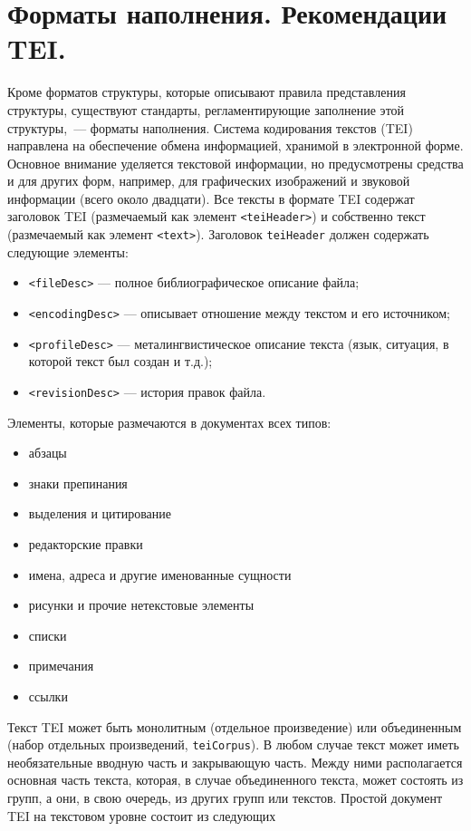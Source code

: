 \documentclass[12pt]{article}
\theoremstyle{definition}
\theoremstyle{remark}
\numberwithin{equation}{section}
\begin{document}
\section{Форматы наполнения. Рекомендации TEI.}
\label{sec:TEI}
Кроме форматов структуры, которые описывают правила представления структуры, существуют стандарты, регламентирующие заполнение этой структуры,~--- форматы наполнения.
Система кодирования текстов (TEI) направлена на обеспечение обмена информацией, хранимой
в электронной форме. Основное внимание уделяется текстовой информации, но предусмотрены средства и для других форм, например, для графических изображений и звуковой информации (всего около двадцати). Все тексты в формате TEI содержат заголовок TEI (размечаемый как элемент \texttt{<teiHeader>}) и собственно текст (размечаемый как элемент \texttt{<text>}). Заголовок \texttt{teiHeader} должен содержать следующие элементы:
\begin{itemize}
\item \texttt{<fileDesc>} --- полное библиографическое описание файла;
\item \texttt{<encodingDesc>} --- описывает отношение между текстом и его источником;
\item \texttt{<profileDesc>} --- металингвистическое описание текста (язык, ситуация, в которой текст был создан и т.д.);
\item \texttt{<revisionDesc>} --- история правок файла.
\end{itemize}
Элементы, которые размечаются в документах всех типов:
\begin{itemize}
\item абзацы
\item знаки препинания
\item выделения и цитирование
\item редакторские правки
\item имена, адреса и другие именованные сущности
\item рисунки и прочие нетекстовые элементы
\item списки
\item примечания
\item ссылки
\end{itemize}
Текст TEI может быть монолитным (отдельное произведение) или объединенным (набор
отдельных произведений, \texttt{teiCorpus}). В любом случае текст может иметь
необязательные вводную часть и закрывающую часть. Между ними располагается основная часть
текста, которая, в случае объединенного текста, может состоять из групп, а они, в свою очередь, из других групп или текстов. Простой документ TEI на текстовом уровне состоит из следующих
\end{document}
